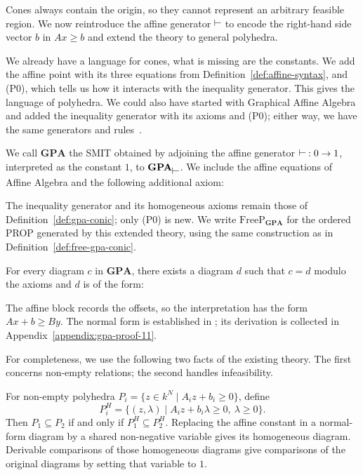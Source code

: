 Cones always contain the origin, so they cannot represent an arbitrary
feasible region. We now reintroduce the affine generator $\rtop$ to
encode the right-hand side vector $b$ in $Ax\ge b$ and extend the theory
to general polyhedra.

We already have a language for cones, what is missing are the
constants. We add the affine point with its three equations from
Definition~\ref{def:affine-syntax}, and (P0), which tells us how it
interacts with the inequality generator. This gives the language of
polyhedra. We could also have started with Graphical Affine Algebra and added
the inequality generator with its axioms and (P0); either way, we
have the same generators and rules~\cite[Section~5]{bonchi2021polyhedral}.

\begin{definition}\label{def:gpa}
    We call $\mathbf{GPA}$ the SMIT obtained by adjoining the affine
    generator $\rtop:0\to1$, interpreted as the constant $1$, to
    $\mathbf{GPA}_{\rtop}$. We include the affine equations of Affine
    Algebra and the following additional axiom:
    
\end{definition}

The inequality generator and its homogeneous axioms remain those of
Definition~\ref{def:gpa-conic}; only (P0) is new.
We write $\mathrm{FreeP}_{\mathbf{GPA}}$ for the ordered PROP generated
by this extended theory, using the same construction as in
Definition~\ref{def:free-gpa-conic}.

\begin{theorem}\label{thm:normalformgpa}
    For every diagram $c$ in $\mathbf{GPA}$, there exists a diagram $d$
    such that $c = d$ modulo the axioms and $d$ is of the form:
    \begin{figure}[H]
        \centering
        
    \end{figure}
\end{theorem}


The affine block records the offsets, so the interpretation has the form
$Ax+b\ge By$. The normal form is established in
\cite[Theorem~24]{bonchi2021polyhedral}; its derivation is collected in
Appendix~\ref{appendix:gpa-proof-11}.

For completeness, we use the following two facts of the existing theory.
The first concerns non-empty relations; the second handles infeasibility.

\begin{lemma}\label{lem:gpa-homogeneous-comparison}
    For non-empty polyhedra
    $P_i=\{z\in k^N\mid A_i z+b_i\ge0\}$, define
    \[
        P_i^H=\{(z,\lambda)\mid A_i z+b_i\lambda\ge0,\ \lambda\ge0\}.
    \]
    Then $P_1\subseteq P_2$ if and only if $P_1^H\subseteq P_2^H$.
    Replacing the affine constant in a normal-form diagram by a shared
    non-negative variable gives its homogeneous diagram. Derivable
    comparisons of those homogeneous diagrams give comparisons of the
    original diagrams by setting that variable to $1$.
\end{lemma}

